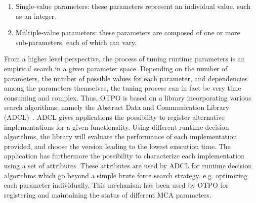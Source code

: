 \begin{enumerate}
\item Single-value parameters: these parameters represent an
  individual value, such as an integer.
\item Multiple-value parameters: these parameters are composed of
  one or more sub-parameters, each of which can vary.
\end{enumerate}

From a higher level perspective, the process of tuning runtime parameters is an empirical search in a given parameter space. Depending on the number of parameters, the number of possible values for each parameter, and dependencies among the parameters themselves, the tuning process can in fact be very time consuming and complex. Thus, OTPO is based on a library incorporating various search algorithms, namely the Abstract Data and Communication Library (ADCL)~\cite{ADCL}. ADCL gives applications the possibility to register alternative implementations for a given functionality. Using different runtime decision algorithms, the library will evaluate the performance of each implementation provided, and choose the version leading to the lowest execution time. The application has furthermore the possibility to characterize each implementation using a set of attributes. These attributes are used by ADCL for runtime decision algorithms which go beyond a simple brute force search strategy, e.g. optimizing each parameter individually. This mechanism has been used by OTPO for registering and maintaining the status of different MCA parameters. 